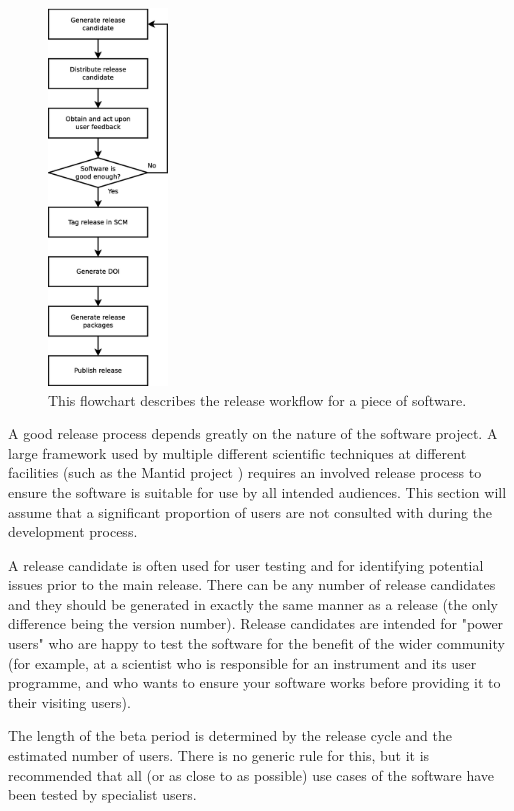 \documentclass[jnr]{iosart2x}
\begin{document}
\begin{figure}
    \centering
    \includegraphics[height=10cm]{release_workflow.eps}
    \caption{This flowchart describes the release workflow for a piece of software.}
    \label{Release_Flowchart}
\end{figure}

A good release process depends greatly on the nature of the software project.
A large framework used by multiple different scientific techniques at different facilities (such as the Mantid project \cite{Manitd}) requires an involved release process to ensure the software is suitable for use by all intended audiences.
This section will assume that a significant proportion of users are not consulted with during the development process.

A release candidate is often used for user testing and for identifying potential issues prior to the main release.
There can be any number of release candidates and they should be generated in exactly the same manner as a release (the only difference being the version number).
Release candidates are intended for "power users" who are happy to test the software for the benefit of the wider community (for example, at a scientist who is responsible for an instrument and its user programme, and who wants to ensure your software works before providing it to their visiting users).

The length of the beta period is determined by the release cycle and the estimated number of users.
There is no generic rule for this, but it is recommended that all (or as close to as possible) use cases of the software have been tested by specialist users.
\end{document}
